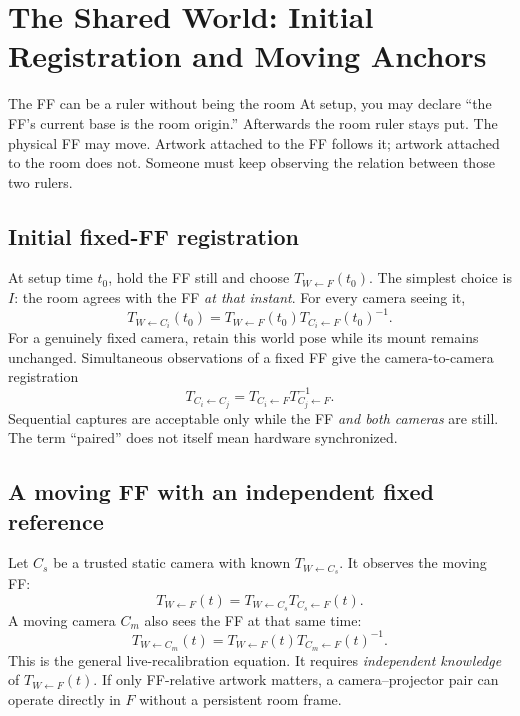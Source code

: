 \documentclass[11pt,a4paper]{article}
\newcommand{\T}[2]{T_{#1\leftarrow #2}}
\begin{document}
\section{The Shared World: Initial Registration and Moving Anchors}
\label{sec:world}

\begin{plain}{The FF can be a ruler without being the room}
At setup, you may declare ``the FF's current base is the room origin.''
Afterwards the room ruler stays put. The physical FF may move.
Artwork attached to the FF follows it; artwork attached to the room does not.
Someone must keep observing the relation between those two rulers.
\end{plain}

\subsection{Initial fixed-FF registration}
At setup time $t_0$, hold the FF still and choose $\T{W}{F}(t_0)$.
The simplest choice is $I$: the room agrees with the FF \emph{at that instant}.
For every camera seeing it,
\begin{equation}
\T{W}{C_i}(t_0)=
\T{W}{F}(t_0)\T{C_i}{F}(t_0)^{-1}.
\label{eq:initial}
\end{equation}
For a genuinely fixed camera, retain this world pose while its mount remains
unchanged. Simultaneous observations of a fixed FF give the camera-to-camera
registration
\begin{equation}
\T{C_i}{C_j}=
\T{C_i}{F}\T{C_j}{F}^{-1}.
\label{eq:paired}
\end{equation}
Sequential captures are acceptable only while the FF \emph{and both cameras}
are still. The term ``paired'' does not itself mean hardware synchronized.

\subsection{A moving FF with an independent fixed reference}
Let $C_s$ be a trusted static camera with known $\T{W}{C_s}$.
It observes the moving FF:
\begin{equation}
\T{W}{F}(t)=\T{W}{C_s}\T{C_s}{F}(t).
\label{eq:movingff}
\end{equation}
A moving camera $C_m$ also sees the FF at that same time:
\begin{equation}
\T{W}{C_m}(t)=
\T{W}{F}(t)\T{C_m}{F}(t)^{-1}.
\label{eq:movingcam}
\end{equation}
This is the general live-recalibration equation. It requires
\emph{independent knowledge} of $\T{W}{F}(t)$.
If only FF-relative artwork matters, a camera--projector pair can operate
directly in $F$ without a persistent room frame.
\end{document}
